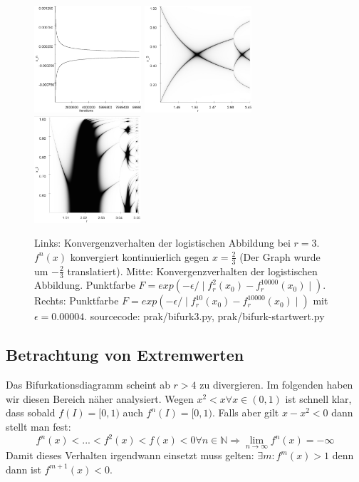 \documentclass[11,5pt, twoside]{article}
\begin{document}
\begin{figure}
\centering
\includegraphics[height=150px]{bifurkpunkt}
\includegraphics[height=150px]{startwert/e0008n2}
\includegraphics[height=150px]{startwert/zoomed10}
\caption{Links: Konvergenzverhalten der logistischen Abbildung bei $r=3$. $f^n(x)$ konvergiert kontinuierlich gegen $x=\frac{2}{3}$ (Der Graph wurde um $-\frac{2}{3}$ translatiert). Mitte: Konvergenzverhalten der logistischen Abbildung. Punktfarbe $F=exp(-\epsilon / \mid f^{2}_r(x_0)-f^{10000}_r(x_0) \mid)$. Rechts: Punktfarbe $F=exp(-\epsilon / \mid f^{10}_r(x_0)-f^{10000}_r(x_0) \mid)$ mit $\epsilon=0.00004$. sourcecode: prak/bifurk3.py, prak/bifurk-startwert.py}
\label{fig:log-konv1}
\end{figure}
\subsection{Betrachtung von Extremwerten}
Das Bifurkationsdiagramm scheint ab $r>4$ zu divergieren. Im folgenden haben wir diesen Bereich näher analysiert. 
Wegen  $x^2 < x \forall x \in (0,1)$ ist schnell klar, dass sobald $f(I) = [0,1)$ auch $f^n(I) = [0, 1)$. 
Falls aber gilt $x-x^2 < 0$ dann stellt man fest:
\begin{equation}
f^n(x) < ... < f^{2}(x) < f(x) < 0 \forall n \in \mathbb{N} \Rightarrow \lim_{n \rightarrow \infty} f^n(x) = -\infty
\end{equation}
Damit dieses Verhalten irgendwann einsetzt muss gelten: $\exists m: f^m(x) > 1$ denn dann ist $f^{m+1}(x) < 0$. 
\end{document}
